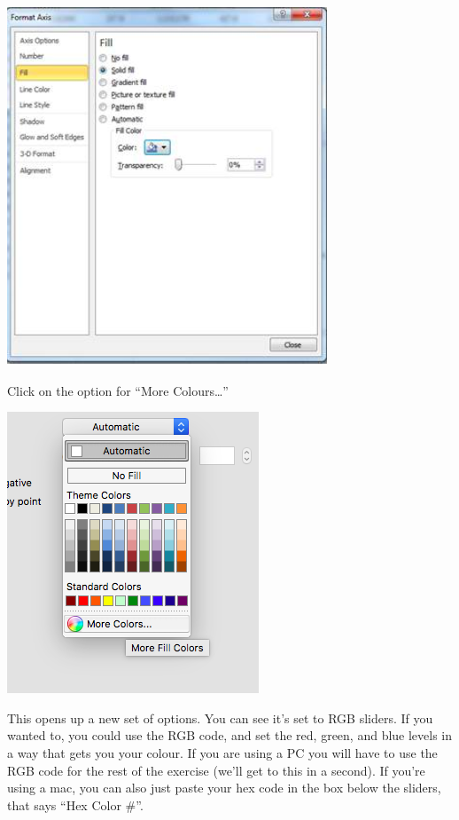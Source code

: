 \documentclass[
]{book}
\begin{document}
\includegraphics{imgs/pc_solid_fill.png}

Click on the option for ``More Colours\ldots{}''

\includegraphics{imgs/manual_fill_2.png}

This opens up a new set of options. You can see it's set to RGB sliders. If you wanted to, you could use the RGB code, and set the red, green, and blue levels in a way that gets you your colour. If you are using a PC you will have to use the RGB code for the rest of the exercise (we'll get to this in a second). If you're using a mac, you can also just paste your hex code in the box below the sliders, that says ``Hex Color \#''.
\end{document}
